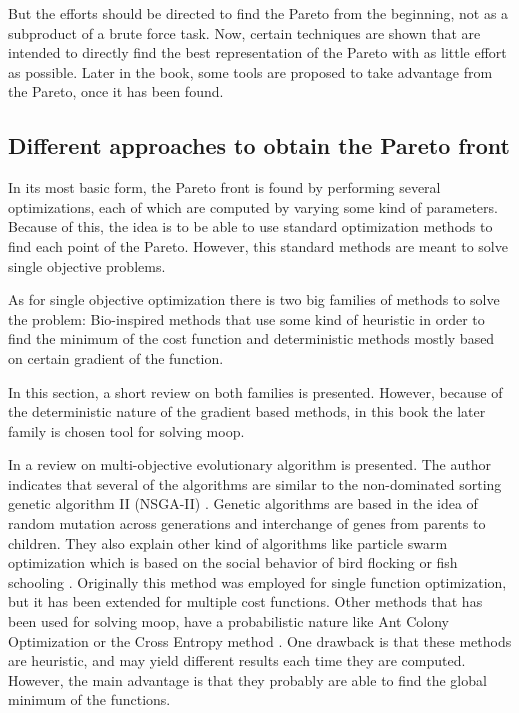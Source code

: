 But the efforts should be directed to find the Pareto from the beginning, not as a subproduct of a brute force task. Now, certain techniques are shown that are intended to directly find the best representation of the Pareto with as little effort as possible. Later in the book, some tools are proposed to take advantage from the Pareto, once it has been found.

\subsection{Different approaches to obtain the Pareto front}
\label{sec:ParetoApproach}
In its most basic form, the Pareto front is found by performing several optimizations, each of which are computed by varying some kind of parameters. Because of this, the idea is to be able to use standard optimization methods to find each point of the Pareto. However, this standard methods are meant to solve single objective problems.

As for single objective optimization there is two big families of methods to solve the problem: Bio-inspired methods that use some kind of heuristic in order to find the minimum of the cost function and deterministic methods mostly based on certain gradient of the function.

In this section, a short review on both families is presented. However, because of the deterministic nature of the gradient based methods, in this book the later family is chosen tool for solving \gls{moop}.

In \citet{Zhou2011} a review on multi-objective evolutionary algorithm is presented. The author indicates that several of the algorithms are similar to the non-dominated sorting genetic algorithm II (NSGA-II) \citep{Deb2002}. Genetic algorithms are based in the idea of random mutation across generations and interchange of genes from parents to children. They also explain other kind of algorithms like particle swarm optimization which is based on the social behavior of bird flocking or fish schooling \citep{Eberhart1995}. Originally this method was employed for single function optimization, but it has been extended for multiple cost functions. Other methods that has been used for solving \gls{moop}, have a probabilistic nature like Ant Colony Optimization \citep{Dorigo2005} or the Cross Entropy method \citep{Rubinstein2004}. One drawback is that these methods are heuristic, and may yield different results each time they are computed. However, the main advantage is that they probably are able to find the global minimum of the functions.

